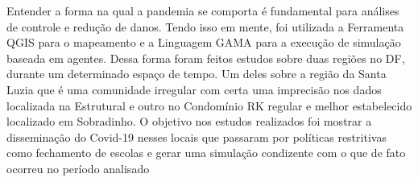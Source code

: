 
Entender a forma na qual a pandemia se comporta é fundamental para análises de controle e redução de danos. Tendo isso em mente, foi utilizada a Ferramenta QGIS para o mapeamento e a Linguagem GAMA para a execução de simulação baseada em agentes. Dessa forma foram feitos estudos sobre duas regiões no DF, durante um determinado espaço de tempo. Um deles sobre a região da Santa Luzia que é uma comunidade irregular com certa uma imprecisão nos dados localizada na Estrutural e outro no Condomínio RK regular e melhor estabelecido localizado em Sobradinho. O objetivo nos estudos realizados foi mostrar a disseminação do Covid-19 nesses locais que passaram por políticas restritivas como fechamento de escolas e gerar uma simulação condizente com o que de fato ocorreu no período analisado
